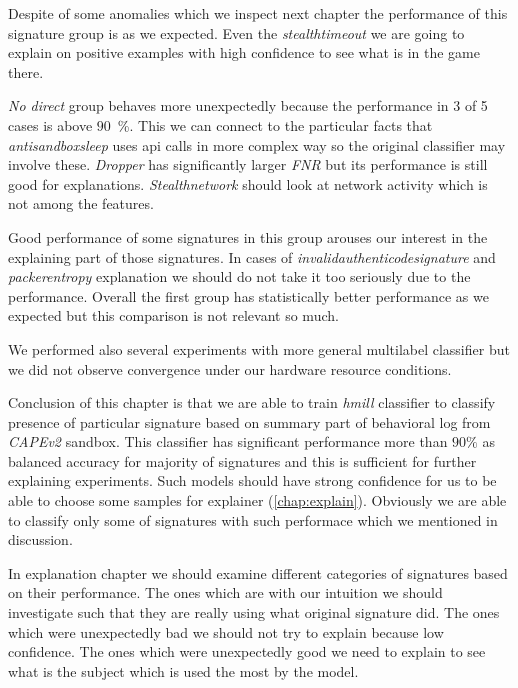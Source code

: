Despite of some anomalies which we inspect next chapter the performance of this signature group is as we expected. Even the \emph{stealthtimeout} we are going to explain on positive examples with high confidence to see what is in the game there.

\emph{No direct} group behaves more unexpectedly because the performance in 3 of 5 cases  is above $90$~\%. This we can connect to the particular facts that \emph{antisandboxsleep} uses api calls in more complex way so the original classifier may involve these. \emph{Dropper} has significantly larger \emph{FNR} but its performance is still good for explanations. \emph{Stealthnetwork} should look at network activity which is not among the features.

Good performance of some signatures in this group arouses our interest in the explaining part of those signatures. In cases of \emph{invalidauthenticodesignature} and \emph{packerentropy} explanation we should do not take it too seriously due to the performance. Overall the first group has statistically better performance as we expected but this comparison is not relevant so much.

We performed also several experiments with more general multilabel classifier but we did not observe convergence under our hardware resource conditions.

Conclusion of this chapter is that we are able to train \emph{hmill} classifier to classify presence of particular signature based on summary part of behavioral log from \emph{CAPEv2} sandbox. This classifier has significant performance more than $90\%$ as balanced accuracy for majority of signatures and this is sufficient for further explaining experiments. Such models should have strong confidence for us to be able to choose some samples for explainer (\ref{chap:explain}). Obviously we are able to classify only some of signatures with such performace which we mentioned in discussion.

In explanation chapter we should examine different categories of signatures based on their performance. The ones which are with our intuition we should investigate such that they are really using what original signature did. The ones which were unexpectedly bad we should not try to explain because low confidence. The ones which were unexpectedly good we need to explain to see what is the subject which is used the most by the model.









